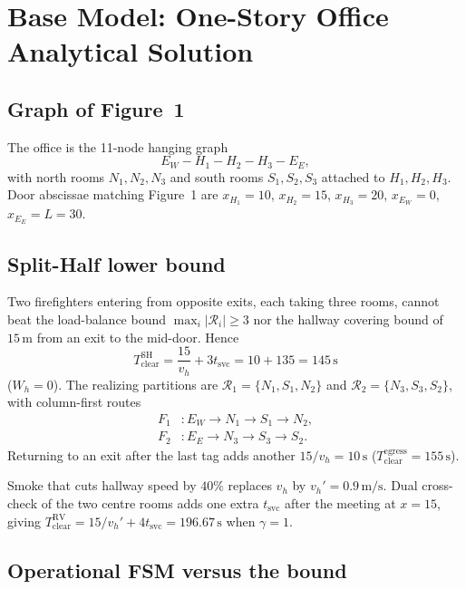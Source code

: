 \documentclass[12pt]{article}
\newcommand{\Tclear}{T_{\mathrm{clear}}}
\newcommand{\tsvc}{t_{\mathrm{svc}}}
\newcommand{\whall}{v_{h}}
\begin{document}
\section{Base Model: One-Story Office Analytical Solution}
\label{sec:req2}

\subsection{Graph of Figure~1}

The office is the 11-node hanging graph
\[
  E_W-H_1-H_2-H_3-E_E,
\]
with north rooms \(N_1,N_2,N_3\) and south rooms \(S_1,S_2,S_3\) attached to
\(H_1,H_2,H_3\). Door abscissae matching Figure~1 are
\(x_{H_1}=10\), \(x_{H_2}=15\), \(x_{H_3}=20\), \(x_{E_W}=0\), \(x_{E_E}=L=30\).

\subsection{Split-Half lower bound}

Two firefighters entering from opposite exits, each taking three rooms, cannot beat
the load-balance bound \(\max_i|\mathcal{R}_i|\ge 3\) nor the hallway covering bound
of \(15\,\mathrm{m}\) from an exit to the mid-door. Hence
\begin{equation}
  \label{eq:tsh}
  \Tclear^{\mathrm{SH}}
  = \frac{15}{\whall} + 3\tsvc
  = 10 + 135
  = 145\,\mathrm{s}
\end{equation}
(\(W_h=0\)). The realizing partitions are
\(\mathcal{R}_1=\{N_1,S_1,N_2\}\) and \(\mathcal{R}_2=\{N_3,S_3,S_2\}\), with
column-first routes
\begin{align*}
  F_1&: E_W\to N_1\to S_1\to N_2,\\
  F_2&: E_E\to N_3\to S_3\to S_2.
\end{align*}
Returning to an exit after the last tag adds another \(15/\whall=10\,\mathrm{s}\)
(\(\Tclear^{\mathrm{egress}}=155\,\mathrm{s}\)).

Smoke that cuts hallway speed by \(40\%\) replaces \(\whall\) by
\(\whall' =0.9\,\mathrm{m/s}\). Dual cross-check of the two centre rooms adds one
extra \(\tsvc\) after the meeting at \(x=15\), giving
\(\Tclear^{\mathrm{RV}}=15/\whall'+4\tsvc=196.67\,\mathrm{s}\) when \(\gamma=1\).

\subsection{Operational FSM versus the bound}
\end{document}
